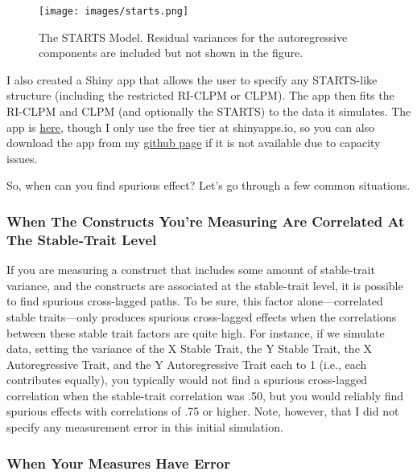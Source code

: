 \documentclass[
  english,
  man,floatsintext]{apa6}
\begin{document}
\begin{figure}
\centering
\texttt{[image: images/starts.png]}
\caption{The STARTS Model. Residual variances for the autoregressive components are included but not shown in the figure.}
\end{figure}

I also created a Shiny app that allows the user to specify any STARTS-like structure (including the restricted RI-CLPM or CLPM). The app then fits the RI-CLPM and CLPM (and optionally the STARTS) to the data it simulates. The app is \href{https://rlucas11.shinyapps.io/clpm/}{here}, though I only use the free tier at shinyapps.io, so you can also download the app from my \href{https://github.com/rlucas11/clpm_app}{github page} if it is not available due to capacity issues.

So, when can you find spurious effect? Let's go through a few common situations.

\hypertarget{when-the-constructs-youre-measuring-are-correlated-at-the-stable-trait-level}{%
\subsubsection{When The Constructs You're Measuring Are Correlated At The Stable-Trait Level}\label{when-the-constructs-youre-measuring-are-correlated-at-the-stable-trait-level}}

If you are measuring a construct that includes some amount of stable-trait variance, and the constructs are associated at the stable-trait level, it is possible to find spurious cross-lagged paths. To be sure, this factor alone---correlated stable traits---only produces spurious cross-lagged effects when the correlations between these stable trait factors are quite high. For instance, if we simulate data, setting the variance of the X Stable Trait, the Y Stable Trait, the X Autoregressive Trait, and the Y Autoregressive Trait each to 1 (i.e., each contributes equally), you typically would not find a spurious cross-lagged correlation when the stable-trait correlation was .50, but you would reliably find spurious effects with correlations of .75 or higher. Note, however, that I did not specify any measurement error in this initial simulation.

\hypertarget{when-your-measures-have-error}{%
\subsubsection{When Your Measures Have Error}\label{when-your-measures-have-error}}
\end{document}
